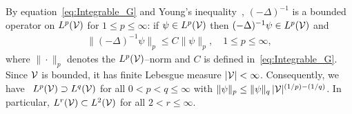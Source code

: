\documentclass[amsa]{ipart}
\begin{document}
By equation~\eqref{eq:Integrable_G} and Young's
inequality~\cite{Folland:95:PDEs,Folland:99:RealAnalysis}, 
$(-\Delta)^{-1}$ is a bounded operator on $L^p(\mathcal{V})$ for $1\leq p\leq\infty$: if $\psi\in
L^p(\mathcal{V})$ then $(-\Delta)^{-1}\psi\in L^p(\mathcal{V})$ and   
%
\begin{align}\label{eq:Young_Ineq}
  \|(-\Delta)^{-1}\psi\|_p\leq C\|\psi\|_p,
  \quad
  1\leq p\leq\infty,
\end{align}
%
where $\|\cdot\|_p$ denotes the $L^p(\mathcal{V})$--norm and $C$ is defined
in~\eqref{eq:Integrable_G}. Since $\mathcal{V}$ is bounded, it has finite
Lebesgue measure $|\mathcal{V}|<\infty$. Consequently, we 
have~\cite{Folland:99:RealAnalysis} $L^p(\mathcal{V})\supset L^q(\mathcal{V})$ for all
$0<p<q\leq\infty$ with $\|\psi\|_p\leq\|\psi\|_q\,|\mathcal{V}|^{(1/p)-(1/q)}$. In particular,
$L^r(\mathcal{V})\subset L^2(\mathcal{V})$ for all $2<r\leq\infty$. 
\end{document}
